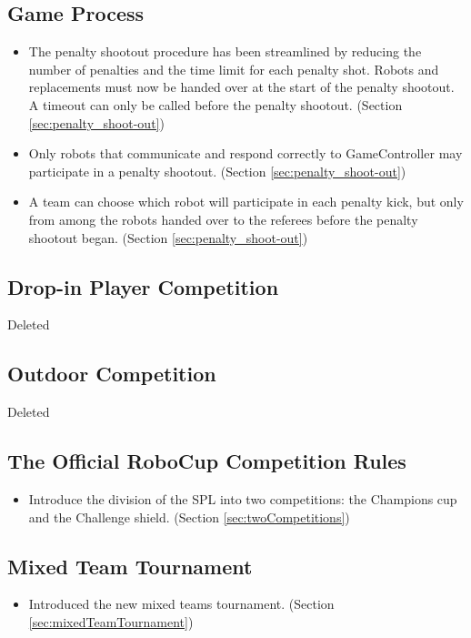 \documentclass[12pt]{article}
\begin{document}
\subsection*{Game Process}
\begin{itemize}
	\item The penalty shootout procedure has been streamlined by reducing the number of penalties and the time limit for each penalty shot. Robots and replacements must now be handed over at the start of the penalty shootout. A timeout can only be called before the penalty shootout. (Section \ref{sec:penalty_shoot-out})
	\item Only robots that communicate and respond correctly to {GameController} may participate in a penalty shootout. (Section \ref{sec:penalty_shoot-out})
	\item A team can choose which robot will participate in each penalty kick, but only from among the robots handed over to the referees before the penalty shootout began. (Section \ref{sec:penalty_shoot-out})
\end{itemize}

\subsection*{Drop-in Player Competition}
Deleted

\subsection*{Outdoor Competition}
Deleted

\subsection*{The Official RoboCup Competition Rules}
\begin{itemize}
	\item Introduce the division of the SPL into two competitions: the Champions cup and the Challenge shield. (Section \ref{sec:twoCompetitions})
\end{itemize}

\subsection*{Mixed Team Tournament}
\begin{itemize}
	\item Introduced the new mixed teams tournament. (Section \ref{sec:mixedTeamTournament})
\end{itemize}
\end{document}
